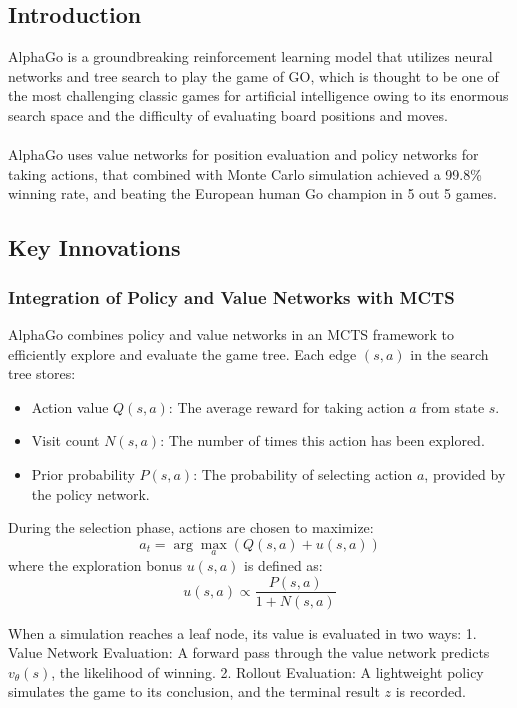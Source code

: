 \subsection{Introduction}
AlphaGo is a groundbreaking reinforcement learning model that utilizes neural networks and tree search to play the game of GO, which is thought to be one of the most challenging classic games for artificial intelligence owing to its enormous search space and the difficulty of evaluating board positions and moves.
\\\\
AlphaGo uses value networks for position evaluation and policy networks for taking actions, that combined with Monte Carlo simulation achieved a 99.8\% winning rate, and beating the European human Go champion in 5 out 5 games.
\subsection{Key Innovations}

\subsubsection*{Integration of Policy and Value Networks with MCTS}
AlphaGo combines policy and value networks in an MCTS framework to efficiently explore and evaluate the game tree. Each edge \( (s, a) \) in the search tree stores:
\begin{itemize}
    \item Action value \( Q(s, a) \): The average reward for taking action \( a \) from state \( s \).
    \item Visit count \( N(s, a) \): The number of times this action has been explored.
    \item Prior probability \( P(s, a) \): The probability of selecting action \( a \), provided by the policy network.
\end{itemize}

During the selection phase, actions are chosen to maximize:
\[
a_t = \arg\max_a \left( Q(s, a) + u(s, a) \right)
\]
where the exploration bonus \( u(s, a) \) is defined as:
\[
u(s, a) \propto \frac{P(s, a)}{1 + N(s, a)}
\]

When a simulation reaches a leaf node, its value is evaluated in two ways:
1. Value Network Evaluation: A forward pass through the value network predicts \( v_\theta(s) \), the likelihood of winning.
2. Rollout Evaluation: A lightweight policy simulates the game to its conclusion, and the terminal result \( z \) is recorded.

